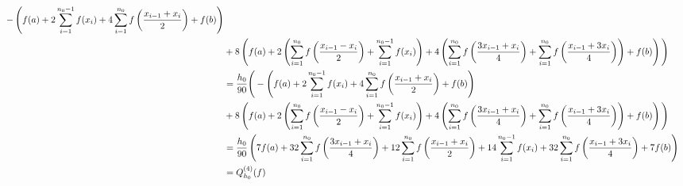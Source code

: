 \begin{align*}
            - \left ( 
                f(a) +
                2 \sum_{i=1}^{n_0 - 1} f(x_i) +
                4 \sum_{i=1}^{n_0} f \left ( \frac{x_{i-1} + x_i}{2} \right ) +
                f(b)
             \right ) \\
    & +
            8 \left ( 
                f(a) +
                2 \left ( 
                    \sum_{i=1}^{n_0} f \left ( \frac{x_{i-1} - x_i}{2} \right ) +
                    \sum_{i=1}^{n_0 - 1} f(x_i)
                 \right ) +
                4 \left ( 
                    \sum_{i=1}^{n_0} f \left ( \frac{3 x_{i-1} + x_i}{4} \right ) +
                    \sum_{i=1}^{n_0} f \left ( \frac{x_{i-1} + 3 x_i}{4} \right )
                 \right ) +
                f(b)
             \right )
        \Bigg ) \\
    & = \frac{h_0}{90}
        \Bigg (
            - \left ( 
                f(a) +
                2 \sum_{i=1}^{n_0 - 1} f(x_i) +
                4 \sum_{i=1}^{n_0} f \left ( \frac{x_{i-1} + x_i}{2} \right ) +
                f(b)
             \right ) \\
    & +
            8 \left ( 
                f(a) +
                2 \left ( 
                    \sum_{i=1}^{n_0} f \left ( \frac{x_{i-1} - x_i}{2} \right ) +
                    \sum_{i=1}^{n_0 - 1} f(x_i)
                 \right ) +
                4 \left ( 
                    \sum_{i=1}^{n_0} f \left ( \frac{3 x_{i-1} + x_i}{4} \right ) +
                    \sum_{i=1}^{n_0} f \left ( \frac{x_{i-1} + 3 x_i}{4} \right )
                 \right ) +
                f(b)
             \right )
        \Bigg ) \\
    & = \frac{h_0}{90}
        \left ( 
            7 f(a) +
            32 \sum_{i=1}^{n_0} f \left ( \frac{3 x_{i-1} + x_i}{4} \right ) +
            12 \sum_{i=1}^{n_0} f \left ( \frac{x_{i-1} + x_i}{2} \right ) +
            14 \sum_{i=1}^{n_0 - 1} f(x_i) +
            32 \sum_{i=1}^{n_0} f \left ( \frac{x_{i-1} + 3 x_i}{4} \right ) +
            7 f(b)
         \right ) \\
    & = Q_{h_0}^{(4)}(f)
\end{align*}